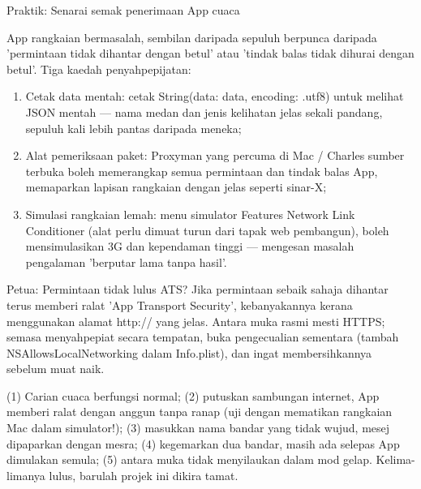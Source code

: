 \begin{tcbpractice}{Praktik: Senarai semak penerimaan App cuaca}

App rangkaian bermasalah, sembilan daripada sepuluh berpunca daripada 'permintaan tidak dihantar dengan betul' atau 'tindak balas tidak dihurai dengan betul'. Tiga kaedah penyahpepijatan:

\begin{enumerate}
  \item Cetak data mentah: cetak String(data: data, encoding: .utf8) untuk melihat JSON mentah — nama medan dan jenis kelihatan jelas sekali pandang, sepuluh kali lebih pantas daripada meneka;
  \item Alat pemeriksaan paket: Proxyman yang percuma di Mac / Charles sumber terbuka boleh memerangkap semua permintaan dan tindak balas App, memaparkan lapisan rangkaian dengan jelas seperti sinar-X;
  \item Simulasi rangkaian lemah: menu simulator Features Network Link Conditioner (alat perlu dimuat turun dari tapak web pembangun), boleh mensimulasikan 3G dan kependaman tinggi — mengesan masalah pengalaman 'berputar lama tanpa hasil'.
\end{enumerate}

\begin{tcbinfo}{Petua: Permintaan tidak lulus ATS?}
Jika permintaan sebaik sahaja dihantar terus memberi ralat 'App Transport Security', kebanyakannya kerana menggunakan alamat http:// yang jelas. Antara muka rasmi mesti HTTPS; semasa menyahpepiat secara tempatan, buka pengecualian sementara (tambah NSAllowsLocalNetworking dalam Info.plist), dan ingat membersihkannya sebelum muat naik.

\end{tcbinfo}

(1) Carian cuaca berfungsi normal; (2) putuskan sambungan internet, App memberi ralat dengan anggun tanpa ranap (uji dengan mematikan rangkaian Mac dalam simulator!); (3) masukkan nama bandar yang tidak wujud, mesej dipaparkan dengan mesra; (4) kegemarkan dua bandar, masih ada selepas App dimulakan semula; (5) antara muka tidak menyilaukan dalam mod gelap. Kelima-limanya lulus, barulah projek ini dikira tamat.

\end{tcbpractice}

